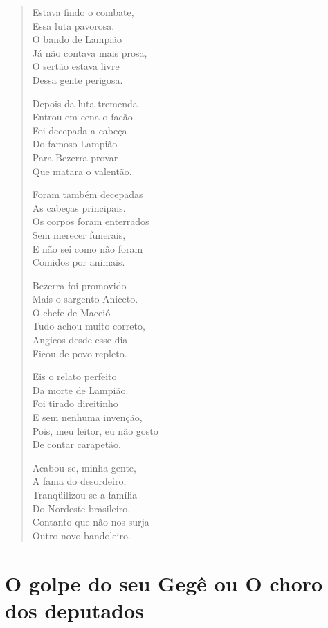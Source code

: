 \begin{verse}
Estava findo o combate,\\
Essa luta pavorosa.\\
O bando de Lampião\\
Já não contava mais prosa,\\
O sertão estava livre\\
Dessa gente perigosa.

Depois da luta tremenda\\
Entrou em cena o facão.\\
Foi decepada a cabeça \\
Do famoso Lampião\\
Para Bezerra provar\\
Que matara o valentão.

Foram também decepadas\\
As cabeças principais.\\
Os corpos foram enterrados\\
Sem merecer funerais,\\
E não sei como não foram\\
Comidos por animais.
\pagebreak

Bezerra foi promovido\\
Mais o sargento Aniceto.\\
O chefe de Maceió\\
Tudo achou muito correto,\\
Angicos desde esse dia\\
Ficou de povo repleto.

Eis o relato perfeito\\
Da morte de Lampião.\\
Foi tirado direitinho\\
E sem nenhuma invenção,\\
Pois, meu leitor, eu não gosto\\
De contar carapetão.

Acabou-se, minha gente,\\
A fama do desordeiro;\\
Tranqüilizou-se a família\\
Do Nordeste brasileiro,\\
Contanto que não nos surja\\
Outro novo bandoleiro.
\end{verse}

\chapter{O golpe do seu Gegê ou O choro dos deputados}


